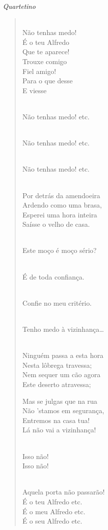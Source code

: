 {\smallskip\raggedleft\itshape Quartetino\par}
\begin{verse}

 \\
Não tenhas medo!\\
É o teu Alfredo\\
Que te aparece!\\
Trouxe comigo\\
Fiel amigo!\\
Para o que desse\\
E viesse


\\
Não tenhas medo! etc.


\\
Não tenhas medo! etc.


\\
Não tenhas medo! etc.


\\
Por detrás da amendoeira\\
Ardendo como uma brasa,\\
Esperei uma hora inteira\\
Saísse o velho de casa.

 \\
Este moço é moço sério?

\\
É de toda confiança.

\pagebreak

\\
Confie no meu critério.

\\
Tenho medo à vizinhança\ldots

\\
Ninguém passa a esta hora\\
Nesta lôbrega travessa;\\
Nem sequer um cão agora\\
Este deserto atravessa;

Mas se julgas que na rua\\
Não 'stamos em segurança,\\
Entremos na casa tua!\\
Lá não vai a vizinhança!

\\
Isso não!\\ 
Isso não!


\\
Aquela porta não passarão!\\
É o teu Alfredo etc.\\
É o meu  Alfredo etc.\\
É o seu Alfredo etc.
\end{verse}

